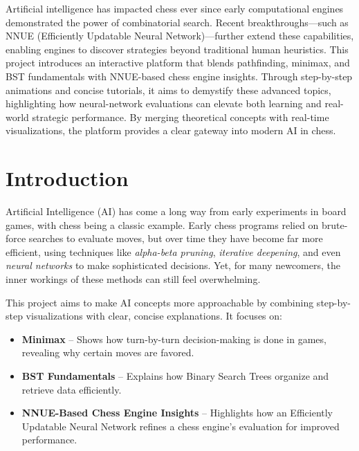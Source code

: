 \documentclass[12pt,a4paper]{article}
\begin{document}
\begin{center}
    \parbox{0.9\textwidth}{
         Artificial intelligence has impacted chess ever since early computational engines demonstrated the power of combinatorial search. Recent breakthroughs—such as NNUE (Efficiently Updatable Neural Network)—further extend these capabilities, enabling engines to discover strategies beyond traditional human heuristics.
        This project introduces an interactive platform that blends pathfinding, minimax, and BST fundamentals with NNUE-based chess engine insights. Through step-by-step animations and concise tutorials, it aims to demystify these advanced topics, highlighting how neural-network evaluations can elevate both learning and real-world strategic performance. By merging theoretical concepts with real-time visualizations, the platform provides a clear gateway into modern AI in chess.
    }
\end{center}


\section{Introduction}
\label{sec:intro}

Artificial Intelligence (AI) has come a long way from early experiments in board games, with chess being a classic example. Early chess programs relied on brute-force searches to evaluate moves, but over time they have become far more efficient, using techniques like \emph{alpha-beta pruning}, \emph{iterative deepening}, and even \emph{neural networks} to make sophisticated decisions. Yet, for many newcomers, the inner workings of these methods can still feel overwhelming.

This project aims to make AI concepts more approachable by combining step-by-step visualizations with clear, concise explanations. It focuses on:
\begin{itemize}
    \item \textbf{Minimax} – Shows how turn-by-turn decision-making is done in games, revealing why certain moves are favored.
    \item \textbf{BST Fundamentals} – Explains how Binary Search Trees organize and retrieve data efficiently.
    \item \textbf{NNUE-Based Chess Engine Insights} – Highlights how an Efficiently Updatable Neural Network refines a chess engine’s evaluation for improved performance.
\end{itemize}
\end{document}
